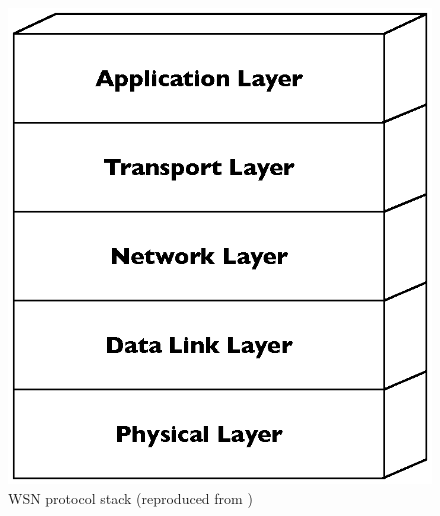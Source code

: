 \begin{figure}
\centering
\includegraphics[scale=0.65]{img/ProtStack.eps}
\caption[WSN protocol stack]{WSN protocol stack (reproduced from \cite{SensorSurveyAkyildiz:2002})}
\label{Fig:ProtStack}
\end{figure}
